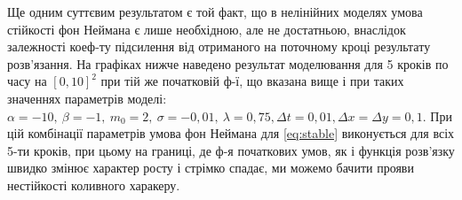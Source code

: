Ще одним суттєвим результатом є той факт, що в нелінійних моделях умова стійкості фон Неймана є лише необхідною, але не достатньою, внаслідок залежності коеф-ту підсилення від отриманого на поточному кроці результату розв’язання. На графіках нижче наведено результат моделювання для 5 кроків по часу на $[0,10]^2$ при тій же початковій ф-ї, що вказана вище і при таких значеннях параметрів моделі: $\alpha = -10,\ \beta = -1,\ m_0 = 2,\ \sigma = -0,01,\ \lambda = 0,75, \Delta t = 0,01, \Delta x = \Delta y = 0,1$. При цій комбінації параметрів умова фон Неймана для \eqref{eq:stable} виконується для всіх 5-ти кроків, при цьому на границі, де ф-я початкових умов, як і функція розв’язку швидко змінює характер росту і стрімко спадає, ми можемо бачити прояви нестійкості коливного харакеру.
\vspace{10pt}
\vspace{10pt}
